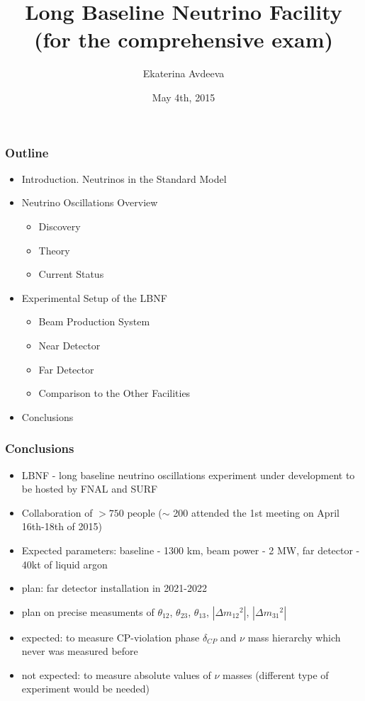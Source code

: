 \documentclass{beamer}
\title{Long Baseline Neutrino Facility \\ (for the comprehensive exam)}
\author{Ekaterina Avdeeva}
\institute{University of Nebraska - Lincoln}
\date{May 4th, 2015}
\begin{document}
\begin{frame}
\titlepage
\end{frame}

\begin{frame}
  \frametitle{Outline}
  \scriptsize
  \begin{itemize}
    \scriptsize
    \item Introduction. Neutrinos in the Standard Model
    \item Neutrino Oscillations Overview
      \begin{itemize}
         \tiny
         \item Discovery
         \item Theory
         \item Current Status
      \end{itemize}   
    \scriptsize
    \item Experimental Setup of the LBNF
      \begin{itemize}
         \tiny
         \item Beam Production System
         \item Near Detector
         \item Far Detector
         \item Comparison to the Other Facilities
      \end{itemize}  
    \scriptsize 
    \item Conclusions
  \end{itemize}
\end{frame}






\begin{frame}\frametitle{Conclusions}
  \scriptsize
  \begin{itemize}
     \item LBNF - long baseline neutrino oscillations experiment under development to be hosted by FNAL and SURF 
     \item Collaboration of $>750$ people ($\sim$ 200 attended the 1st meeting on April 16th-18th of 2015)
     \item Expected parameters: baseline - 1300 km, beam power - 2 MW, far detector - 40kt of liquid argon
     \item plan: far detector installation in 2021-2022
     \item plan on precise measuments of $\theta_{12}$, $\theta_{23}$, $\theta_{13}$, $|\Delta{m_{12}}^2|$, $|\Delta{m_{31}}^2|$
     \item expected: to measure CP-violation phase $\delta_{CP}$ and $\nu$ mass hierarchy which never was measured before
     \item not expected: to measure absolute values of $\nu$ masses (different type of experiment would be needed)
  \end{itemize}
\end{frame}

%
%
\end{document}
